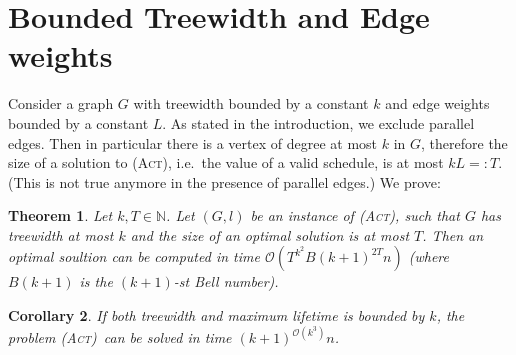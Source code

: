 \documentclass[10pt,a4paper]{article}
\newtheorem{theorem}{Theorem}[section]
\newtheorem{corollary}[theorem]{Corollary}
\numberwithin{equation}{section}
\newcommand{\N}{\mathbb{N}}
\newcommand{\bigO}{\mathcal{O}}
\newcommand{\act}{\textsc{(Act)}}
\begin{document}
\section{Bounded Treewidth and Edge weights}

Consider a graph $G$ with treewidth bounded by a constant $k$ and edge weights bounded by a  constant $L$. As stated in the introduction, we exclude parallel edges. Then in particular there is a vertex of degree at most $k$ in $G$, therefore the size of a solution to \act, i.e.\ the value of a valid schedule, is at most $kL =: T$. (This is not true anymore in the presence of parallel edges.) We prove:

\begin{theorem} \label{thm_dynamic_program}
Let $k, T \in \N$. Let $(G, l)$ be an instance of \act, such that $G$ has treewidth at most $k$ and the size of an optimal solution is at most $T$. Then an optimal soultion can be computed in time $\bigO(T^{k^2}B(k+1)^{2T}n)$ (where $B(k+1)$ is the $(k+1)$-st Bell number).
\end{theorem}

\begin{corollary}
If both treewidth and maximum lifetime is bounded by $k$, the problem \act\ can be solved in time $(k+1)^{\bigO(k^3)}n$.
\end{corollary}
\end{document}
